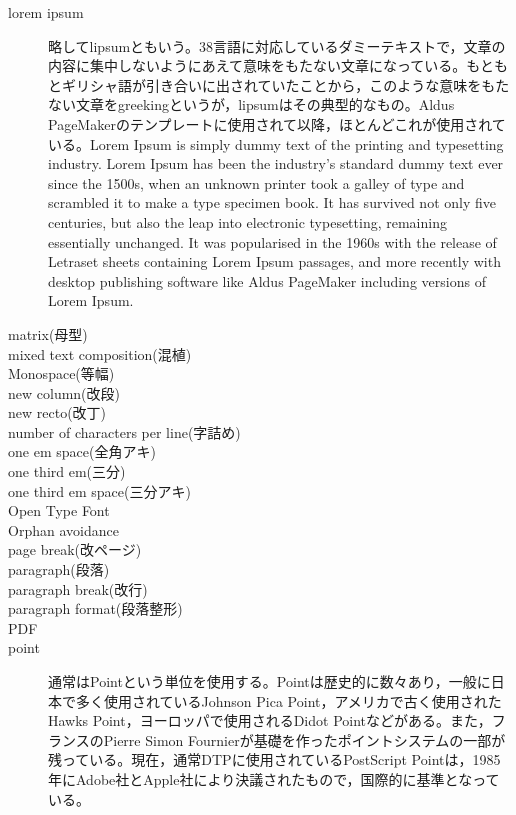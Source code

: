 \begin{description}
    \item[lorem ipsum]略してlipsumともいう。38言語に対応しているダミーテキストで，文章の内容に集中しないようにあえて意味をもたない文章になっている。もともとギリシャ語が引き合いに出されていたことから，このような意味をもたない文章をgreekingというが，lipsumはその典型的なもの。Aldus PageMakerのテンプレートに使用されて以降，ほとんどこれが使用されている\cite{handbook_of_typography}。Lorem Ipsum is simply dummy text of the printing and typesetting industry. Lorem Ipsum has been the industry's standard dummy text ever since the 1500s, when an unknown printer took a galley of type and scrambled it to make a type specimen book. It has survived not only five centuries, but also the leap into electronic typesetting, remaining essentially unchanged. It was popularised in the 1960s with the release of Letraset sheets containing Lorem Ipsum passages, and more recently with desktop publishing software like Aldus PageMaker including versions of Lorem Ipsum\cite{www.lipsum.com}.
    \item[matrix(母型)]
    \item[mixed text composition(混植)]
    \item[Monospace(等幅)]
    \item[new column(改段)]
    \item[new recto(改丁)]
    \item[number of characters per line(字詰め)]
    \item[one em space(全角アキ)]
    \item[one third em(三分)]
    \item[one third em space(三分アキ)]
    \item[Open Type Font]
    \item[Orphan avoidance]
    \item[page break(改ページ)]
    \item[paragraph(段落)]
    \item[paragraph break(改行)]
    \item[paragraph format(段落整形)]
    \item[PDF]
    \item[point]通常はPointという単位を使用する。Pointは歴史的に数々あり，一般に日本で多く使用されているJohnson Pica Point，アメリカで古く使用されたHawks Point，ヨーロッパで使用されるDidot Pointなどがある。また，フランスのPierre Simon Fournierが基礎を作ったポイントシステムの一部が残っている。現在，通常DTPに使用されているPostScript Pointは，1985年にAdobe社とApple社により決議されたもので，国際的に基準となっている\cite{handbook_of_typography}。

\end{description}
